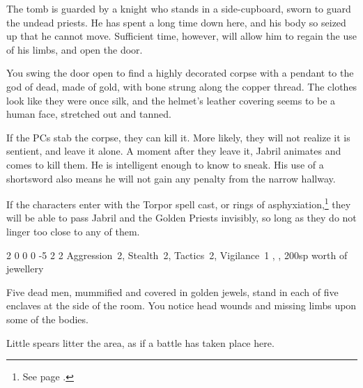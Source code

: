 \begin{multicols}{2}

The tomb is guarded by a knight who stands in a side-cupboard, sworn to guard the undead priests.
He has spent a long time down here, and his body so seized up that he cannot move.
Sufficient time, however, will allow him to regain the use of his limbs, and open the door.

\begin{boxtext}

  You swing the door open to find a highly decorated corpse with a pendant to the god of dead, made of gold, with bone strung along the copper thread.
  The clothes look like they were once silk, and the helmet's leather covering seems to be a human face, stretched out and tanned.

\end{boxtext}

If the PCs stab the corpse, they can kill it.
More likely, they will not realize it is sentient, and leave it alone.
A moment after they leave it, Jabril animates and comes to kill them.
He is intelligent enough to know to sneak.
His use of a shortsword also means he will not gain any penalty from the narrow hallway.

If the characters enter with the Torpor spell cast, or rings of asphyxiation,\footnote{See page \pageref{ring_asphyxiation}.} they will be able to pass Jabril and the Golden Priests invisibly, so long as they do not linger too close to any of them.


  {2}%
  {0}%
  {{0}%
  {0}%
  {-5}}%
  {2}%
  {2}%
  {Aggression~2, Stealth~2, Tactics~2, Vigilance~1}%
  {\shortsword, \completeplate, 200sp worth of jewellery}%
  {}


\begin{boxtext}

  Five dead men, mummified and covered in golden jewels, stand in each of five enclaves at the side of the room.
  You notice head wounds and missing limbs upon some of the bodies.

  Little spears litter the area, as if a battle has taken place here.

\end{boxtext}

\begin{exampletext}


\end{exampletext}
\end{multicols}
